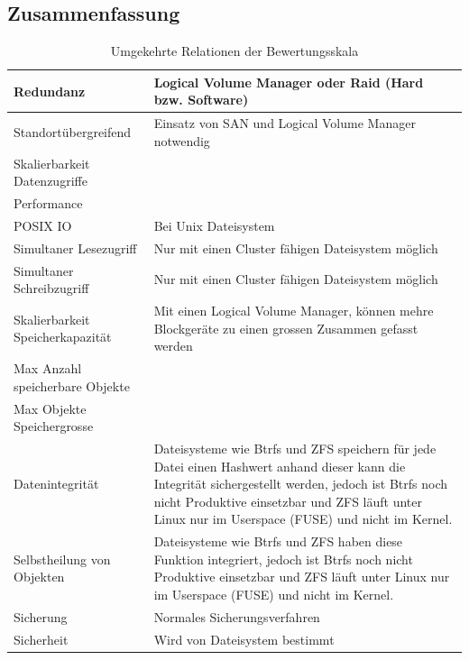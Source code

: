 \subsection{Zusammenfassung}

\begin{table}[htbp]
\caption{Umgekehrte Relationen der Bewertungsskala}
\begin{tabular}{|L{3.5cm}|L{10cm}|}
\hline
Redundanz & Logical Volume Manager oder Raid (Hard bzw. Software) \\ \hline
Standortübergreifend & Einsatz von SAN und Logical Volume Manager notwendig \\ \hline
Skalierbarkeit Datenzugriffe &  \\ \hline
Performance &  \\ \hline
POSIX IO & Bei Unix Dateisystem \\ \hline
Simultaner Lesezugriff & Nur mit einen Cluster fähigen Dateisystem möglich \\ \hline
Simultaner Schreibzugriff & Nur mit einen Cluster fähigen Dateisystem möglich \\ \hline
Skalierbarkeit Speicherkapazität & Mit einen Logical Volume Manager, können mehre Blockgeräte zu einen grossen Zusammen gefasst werden \\ \hline
Max Anzahl speicherbare Objekte &  \\ \hline
Max Objekte Speichergrosse &  \\ \hline
Datenintegrität & Dateisysteme wie Btrfs und ZFS speichern für jede Datei einen Hashwert anhand dieser kann die Integrität sichergestellt werden, jedoch ist Btrfs noch nicht Produktive einsetzbar und ZFS läuft unter Linux nur im Userspace (FUSE) und nicht im Kernel. \\ \hline
Selbstheilung von Objekten & Dateisysteme wie Btrfs und ZFS haben diese Funktion integriert, jedoch ist Btrfs noch nicht Produktive einsetzbar und ZFS läuft unter Linux nur im Userspace (FUSE) und nicht im Kernel. \\ \hline
Sicherung & Normales Sicherungsverfahren \\ \hline
Sicherheit & Wird von Dateisystem bestimmt \\ \hline
\end{tabular}
\label{UmgekehrteBewertungsskala}
\end{table}


